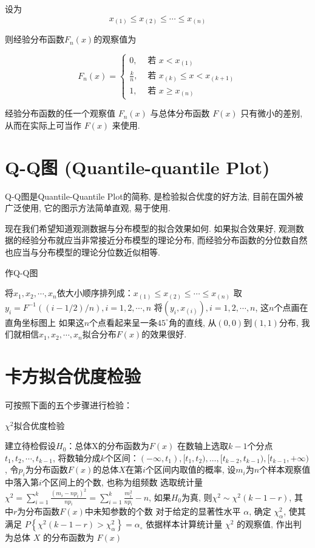 设为
$$
x_{(1)} \leq x_{(2)} \leq \cdots \leq x_{(n)}
$$

则经验分布函数$F_{n}(x)$的观察值为

$$
F_{n}(x)=\left\{\begin{array}{ll}
0, & \text { 若 } x<x_{(1)} \\
\frac{k}{n}, & \text { 若 } x_{(k)} \leq x<x_{(k+1)} \\
1, & \text { 若 } x \geq x_{(n)}
\end{array}\right.
$$

经验分布函数的任一个观察值 $F_n(x)$ 与总体分布函数 $F(x)$ 只有微小的差别, 从而在实际上可当作 $F(x)$ 来使用. 

\section{Q-Q图 (Quantile-quantile Plot)}

Q-Q图是Quantile-Quantile Plot的简称, 是检验拟合优度的好方法, 目前在国外被广泛使用, 它的图示方法简单直观, 易于使用. 

现在我们希望知道观测数据与分布模型的拟合效果如何. 如果拟合效果好, 观测数据的经验分布就应当非常接近分布模型的理论分布, 而经验分布函数的分位数自然也应当与分布模型的理论分位数近似相等. 

\begin{algorithm}
    \caption{作Q-Q图}
    
将$x_1,x_2,\cdots,x_n$依大小顺序排列成：$x_{(1)}\le x_{(2)}\le\cdots\le x_{(n)}$\;
取$y_i=F^{-1}((i-1/2)/n), i=1,2,\cdots,n$\;
将$(y_i,x_{(i)}), i=1,2,\cdots,n$, 这$n$个点画在直角坐标图上\;
如果这$n$个点看起来呈一条$45^\circ$角的直线, 从$(0,0)$到$(1,1)$分布, 我们就相信$x_1,x_2,\cdots,x_n$拟合分布$F(x)$的效果很好. 
\end{algorithm}

\section{卡方拟合优度检验}

可按照下面的五个步骤进行检验：

\begin{algorithm}
\caption{$\chi^2$拟合优度检验}
建立待检假设$H_0$：总体X的分布函数为$F(x)$\;
在数轴上选取$k-1$个分点$t_1,t_2,\cdots,t_{k-1}$, 将数轴分成$k$个区间：$(-\infty,t_1), [t_1,t_2), …, [t_{k-2},t_{k-1}), [t_{k-1},+\infty)$, 令$p_i$为分布函数$F(x)$的总体$X$在第$i$个区间内取值的概率, 设$m_i$为$n$个样本观察值中落入第$i$个区间上的个数, 也称为组频数\;
选取统计量$\chi^2=\sum_{i=1}^{k}\frac{(m_i-np_i)^2}{np_i}=\sum_{i=1}^{k}{\frac{m_i^2}{np_i}-n}$, 如果$H_0$为真, 则$\chi^2 \sim \chi^2(k-1-r)$, 其中$r$为分布函数$F(x)$中未知参数的个数\;
对于给定的显著性水平 \( \alpha \), 确定 \( \chi_{\alpha}^{2} \), 使其满足 \( P\left\{\chi^{2}(k-1-r)>\chi_{\alpha}^{2}\right\}=\alpha_{\circ} \) \;
依据样本计算统计量 \( \chi^{2} \) 的观察值, 作出判
为总体 \( X \) 的分布函数为 \( F(x) \) \;
\end{algorithm}

